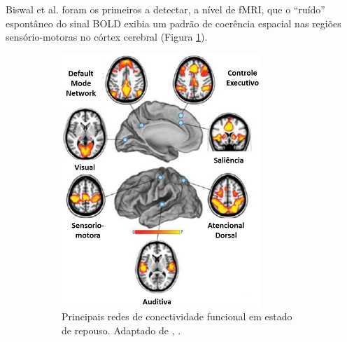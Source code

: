 \documentclass[11pt]{article}
\begin{document}
Biswal et al. \citep{biswal1995}  foram os primeiros a detectar, a nível de fMRI, que o “ruído” espontâneo do sinal BOLD exibia um padrão de coerência espacial nas regiões sensório-motoras no córtex cerebral (Figura \ref{f:restnet1}).

\begin{figure}[!htb]
    \centering
    \begin{subfigure}[b]{0.4\linewidth}        %
        \centering
        \includegraphics[width=\linewidth]{Qualificacao/images/restnet1.png}
        \caption{Principais redes de conectividade funcional em estado de repouso. Adaptado de \citeauthor{Raichle2011}, \citeyear{Raichle2011}.}
        \label{f:restnet1}
    \end{subfigure}\hfill
    \begin{subfigure}[b]{0.4\linewidth}        %
        \centering

\end{subfigure}
\end{figure}
\end{document}
